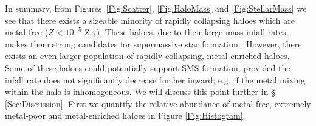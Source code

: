 \documentclass[graphics, twocolumn, usenatbib]{mn2e}
\newcommand{\zsolarc} {$\rm{Z_{\odot}}$}
\begin{document}
In summary, from Figures~\ref{Fig:Scatter}, \ref{Fig:HaloMass}
and \ref{Fig:StellarMass} we see that there exists a sizeable minority of rapidly collapsing haloes
which are metal-free ($Z < 10^{-5}$ \zsolarc). These
haloes, due to their large mass infall rates, makes them strong candidates for supermassive
star formation \citep{Woods_2018, Chon_2020}. However,  there exists an even larger population of
rapidly collapsing, metal enriched haloes. Some of these haloes could potentially support SMS formation,
provided the infall rate does not significantly decrease further inward; 
e.g. if the metal mixing within the halo is inhomogeneous. We will discuss this point further in \S
\ref{Sec:Discussion}. First we quantify the relative abundance of metal-free, extremely metal-poor
and metal-enriched haloes in Figure \ref{Fig:Histogram}.
\end{document}
